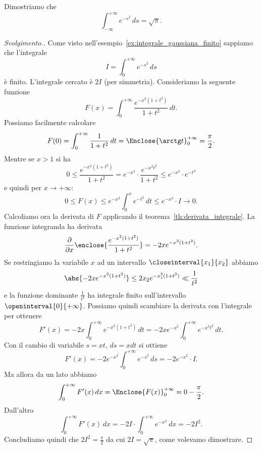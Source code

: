 \begin{exercise}
  \label{ex:integrale_gaussiana}%
Dimostriamo che 
\[
  \int_{-\infty}^{+\infty} e^{-s^2}\, ds = \sqrt \pi.
\]
\end{exercise}
%
\begin{proof}[Svolgimento.]
Come visto nell'esempio~\ref{ex:integrale_gaussiana_finito}
sappiamo che l'integrale
\[
  I = \int_{0}^{+\infty} e^{-s^2}\, ds
\]
è finito. 
L'integrale cercato è $2I$ (per simmetria).
Consideriamo la seguente funzione
\[ 
  F(x) = \int_0^{+\infty} \frac{e^{-x^2(1+t^2)}}{1+t^2}\, dt.
\]
Possiamo facilmente calcolare 
\[
  F(0) = \int_0^{+\infty} \frac{1}{1+t^2}\, dt = \Enclose{\arctg t}_0^{+\infty} = \frac \pi 2.
\]
Mentre se $x>1$ si ha 
\[
  0\le \frac{e^{-x^2(1+t^2)}}{1+t^2}
  = e^{-x^2}\cdot \frac{e^{-x^2t^2}}{1+t^2}
  \le e^{-x^2}\cdot e^{-t^2}
\]
e quindi per $x\to +\infty$:
\[
  0\le F(x) \le e^{-x^2} \int_0^x e^{-t^2}\, dt \le e^{-x^2}\cdot I \to 0.
\]
Calcoliamo ora la derivata di $F$ applicando il teorema~\ref{th:derivata_integrale}.
La funzione integranda ha derivata 
\[
 \frac{\partial}{\partial x}\enclose {\frac{e^{-x^2(1+t^2)}}{1+t^2}}
 = -2x e^{-x^2(1+t^2)}.
\]
Se restringiamo la variabile $x$ ad un intervallo $\closeinterval{x_1}{x_2}$
abbiamo 
\[
 \abs{-2x e^{-x^2(1+t^2)}}
 \le 2 x_2 e^{-x_1^2(1+t^2)} \ll \frac{1}{t^2}
\]
e la funzione dominante $\frac{1}{t^2}$ ha integrale finito sull'intervallo 
$\openinterval{0}{+\infty}$. 
Possiamo quindi scambiare la derivata con l'integrale per ottenere 
\[
 F'(x) = - 2 x\int_0^{+\infty} e^{-x^2(1+t^2)}\, dt
       = - 2 x e^{-x^2}\int_0^{+\infty} e^{-x^2t^2}\, dt. 
\]
Con il cambio di variabile $s=xt$, $ds=x dt$ si ottiene
\[
 F'(x) = -2 e^{-x^2}\int_0^{+\infty} e^{-s^2}\, ds = - 2 e^{-x^2}\cdot I.
\]
Ma allora da un lato abbiamo 
\[
  \int_0^{+\infty} F'(x)\, dx 
  = \Enclose{F(x)}_0^{+\infty}  = 0 - \frac{\pi}{2}.
\]
Dall'altro 
\[
 \int_0^{+\infty} F'(x)\, dx 
 = - 2 I \cdot \int_0^{+\infty} e^{-x^2}\, dx
 = - 2 I^2. 
\]
Concludiamo quindi che $2I^2 = \frac \pi 2$ da cui 
$2I=\sqrt \pi$, come volevamo dimostrare.
\end{proof}

